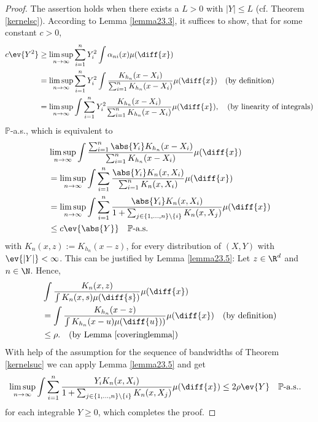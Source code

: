 \begin{proof} 
The assertion holds when there exists a $L>0$ with $|Y| \leq L$ (cf. Theorem \ref{kernelsc}).
According to Lemma \ref{lemma23.3}, it suffices to show, that for some constant $c>0$,
\begin{align*}
    c\ev{Y^2} 
    &\geq \limsup_{n\to\infty} \sum_{i=1}^{n} Y_i^2 \int \alpha_{ni}(x) \mu(\diff{x}) \\
    &= \limsup_{n\to\infty} \sum_{i=1}^{n} Y_i^2 \int \frac{K_{h_n}(x-X_i)}{\sum_{i=1}^n K_{h_n}(x-X_i)} \mu(\diff{x}) \quad\text{(by definition)}\\
    &= \limsup_{n\to\infty} \int \sum_{i=1}^{n} Y_i^2 \frac{K_{h_n}(x-X_i)}{\sum_{i=1}^n K_{h_n}(x-X_i)} \mu(\diff{x}), \quad\text{(by linearity of integrals)}\\
\end{align*}
$\mathbb{P}$-a.s., which is equivalent to
\begin{align*}
    &\limsup_{n\to\infty} \int \frac{\sum_{i=1}^{n}\abs{Y_i} K_{h_n}(x-X_i)}{\sum_{i=1}^{n}K_{h_n}(x-X_i)} \mu(\diff{x}) \\
    &= \limsup_{n\to\infty} \int \sum_{i=1}^{n} \frac{\abs{Y_i} K_n(x,X_i)}{\sum_{i=1}^{n}K_n(x,X_i)} \mu(\diff{x}) \\
    &= \limsup_{n\to\infty} \int \sum_{i=1}^{n} \frac{\abs{Y_i} K_n(x,X_i)}{1+\sum_{j\in\{1,...,n\}\setminus\{i\}} K_n(x,X_j)} \mu(\diff{x}) \\
    &\leq c\ev{\abs{Y}} \quad\text{$\mathbb{P}$-a.s.}
\end{align*}
with \(K_n(x, z) := K_{h_n}(x - z)\), 
for every distribution of $(X,Y)$ with $\ev{|Y|}<\infty$. This can be justified by Lemma \ref{lemma23.5}: Let $z \in \R^d$ and $n \in \N$. Hence,
\begin{align*}
    &\int \frac{K_n(x,z)}{\int K_n(x,s) \mu(\diff{s})} \mu(\diff{x}) \\
    &= \int \frac{K_{h_n}(x-z)}{\int K_{h_n}(x-u) \mu(\diff{u}))} \mu(\diff{x}) \quad\text{(by definition)} \\
    &\leq \rho. \quad \text{(by Lemma \ref{coveringlemma})}
\end{align*}
With help of the assumption for the sequence of bandwidths of Theorem \ref{kernelsuc} we can apply Lemma \ref{lemma23.5} and get
\begin{align*}
    \limsup_{n\to\infty} \int \sum_{i=1}^{n} \frac{Y_i K_n(x,X_i)}{1+\sum_{j\in\{1,...,n\}\setminus\{i\}} K_n(x,X_j)} \mu(\diff{x}) 
    &\leq 2\rho \ev{Y} \quad\mathbb{P}\text{-a.s.}.
\end{align*}
for each integrable $Y\geq0$, which completes the proof.
\end{proof}

